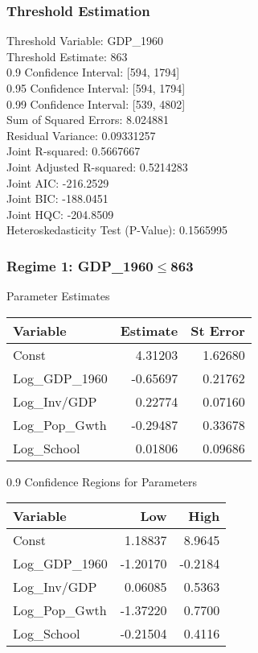 \subsubsection{Threshold Estimation} 
Threshold Variable:                 GDP\_1960 \\
Threshold Estimate:                 863 \\
0.9 Confidence Interval:           [594, 1794] \\
0.95 Confidence Interval:           [594, 1794] \\
0.99 Confidence Interval:           [539, 4802] \\
Sum of Squared Errors:              8.024881 \\
Residual Variance:                  0.09331257 \\
Joint R-squared:                    0.5667667 \\
Joint Adjusted R-squared:           0.5214283 \\
Joint AIC:                          -216.2529 \\
Joint BIC:                          -188.0451 \\
Joint HQC:                          -204.8509 \\
Heteroskedasticity Test (P-Value):  0.1565995 \\

\subsubsection*{Regime 1: GDP\_1960$\leq$863 } 
Parameter Estimates \\
\begin{tabular}{l*{2}{r}}
\toprule
Variable    &   Estimate     &   St Error \\
\midrule 
Const   &    4.31203   &   1.62680 \\
Log\_GDP\_1960   &   -0.65697   &   0.21762 \\
Log\_Inv/GDP   &    0.22774   &   0.07160 \\
Log\_Pop\_Gwth   &   -0.29487   &   0.33678 \\
Log\_School   &    0.01806   &   0.09686 \\
\bottomrule
\end{tabular}
\bigskip 

0.9 Confidence Regions for Parameters \\
\begin{tabular}{l*{2}{r}}
\toprule
Variable   &    Low            &   High \\
\midrule 
Const   &    1.18837   &    8.9645 \\
Log\_GDP\_1960   &   -1.20170   &   -0.2184 \\
Log\_Inv/GDP   &    0.06085   &    0.5363 \\
Log\_Pop\_Gwth   &   -1.37220   &    0.7700 \\
Log\_School   &   -0.21504   &    0.4116 \\
\bottomrule
\end{tabular}
\bigskip 

